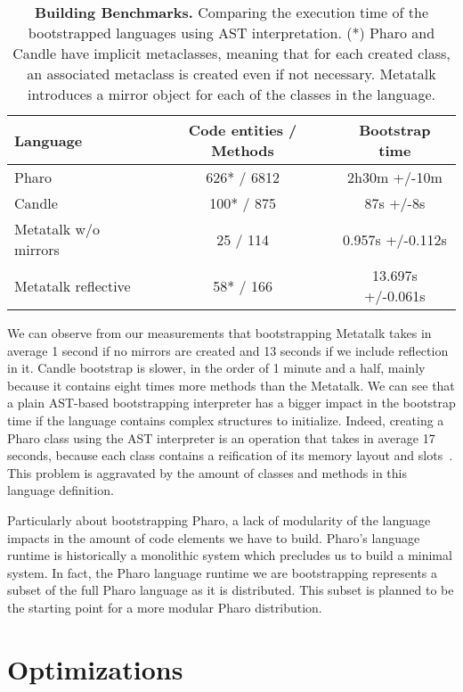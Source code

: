  \begin{table}[ht]
 \small
 	\centering
 	\begin{tabular}{lcc}
			\toprule
			\textbf{Language}
			& \xspace\textbf{Code entities / Methods}\xspace
			& \xspace\textbf{Bootstrap time}\\
		\toprule
		Pharo & 626* / 6812 & 2h30m +/-10m \\\midrule
		Candle & 100* / 875 & 87s +/-8s \\\midrule
		Metatalk w/o mirrors & 25 / 114 & 0.957s +/-0.112s \\\midrule
		Metatalk reflective & 58* / 166 & 13.697s +/-0.061s \\\bottomrule
 	\end{tabular}
		\vspace*{0.2cm}
 	\caption{\small\textbf{Building Benchmarks.} Comparing the execution time of the bootstrapped languages using AST interpretation. (*) Pharo and Candle have implicit metaclasses, meaning that for each created class, an associated metaclass is created even if not necessary. Metatalk introduces a mirror object for each of the classes in the language.\label{tb:measurements}}
 \end{table}

We can observe from our measurements that bootstrapping Metatalk takes in average 1 second if no mirrors are created and 13 seconds if we include reflection in it. Candle bootstrap is slower, in the order of 1 minute and a half, mainly because it contains eight times more methods than the Metatalk. We can see that a plain AST-based bootstrapping interpreter has a bigger impact in the bootstrap time if the language contains complex structures to initialize.  Indeed, creating a Pharo class using the AST interpreter is an operation that takes in average 17 seconds, because each class contains a reification of its memory layout and slots~\cite{Verw11a}. This problem is aggravated by the amount of classes and methods in this language definition.

Particularly about bootstrapping Pharo, a lack of modularity of the language impacts in the amount of code elements we have to build. Pharo's language runtime is historically a monolithic system which precludes us to build a minimal system. In fact, the Pharo language runtime we are bootstrapping represents a subset of the full Pharo language as it is distributed. This subset is planned to be the starting point for a more modular Pharo distribution.

\section{Optimizations}\label{sec:optimisations}


